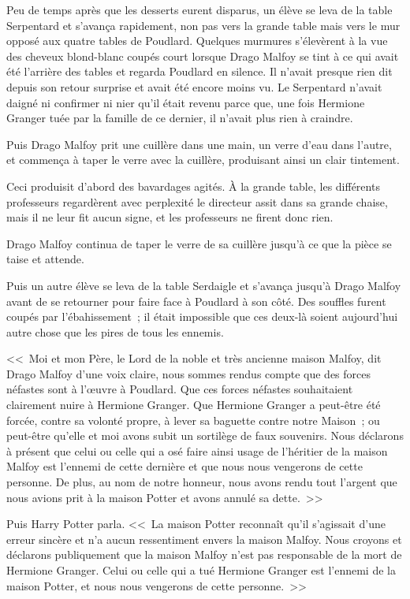 Peu de temps après que les desserts eurent disparus, un élève se leva de la table Serpentard et s'avança rapidement, non pas vers la grande table mais vers le mur opposé aux quatre tables de Poudlard. Quelques murmures s'élevèrent à la vue des cheveux blond-blanc coupés court lorsque Drago Malfoy se tint à ce qui avait été l'arrière des tables et regarda Poudlard en silence. Il n'avait presque rien dit depuis son retour surprise et avait été encore moins vu. Le Serpentard n'avait daigné ni confirmer ni nier qu'il était revenu parce que, une fois Hermione Granger tuée par la famille de ce dernier, il n'avait plus rien à craindre.

Puis Drago Malfoy prit une cuillère dans une main, un verre d'eau dans l'autre, et commença à taper le verre avec la cuillère, produisant ainsi un clair tintement.

Ceci produisit d'abord des bavardages agités. À la grande table, les différents professeurs regardèrent avec perplexité le directeur assit dans sa grande chaise, mais il ne leur fit aucun signe, et les professeurs ne firent donc rien.

Drago Malfoy continua de taper le verre de sa cuillère jusqu'à ce que la pièce se taise et attende.

Puis un autre élève se leva de la table Serdaigle et s'avança jusqu'à Drago Malfoy avant de se retourner pour faire face à Poudlard à son côté. Des souffles furent coupés par l'ébahissement~; il était impossible que ces deux-là soient aujourd'hui autre chose que les pires de tous les ennemis.

<<~Moi et mon Père, le Lord de la noble et très ancienne maison Malfoy, dit Drago Malfoy d'une voix claire, nous sommes rendus compte que des forces néfastes sont à l'œuvre à Poudlard. Que ces forces néfastes souhaitaient clairement nuire à Hermione Granger. Que Hermione Granger a peut-être été forcée, contre sa volonté propre, à lever sa baguette contre notre Maison~; ou peut-être qu'elle et moi avons subit un sortilège de faux souvenirs. Nous déclarons à présent que celui ou celle qui a osé faire ainsi usage de l'héritier de la maison Malfoy est l'ennemi de cette dernière et que nous nous vengerons de cette personne. De plus, au nom de notre honneur, nous avons rendu tout l'argent que nous avions prit à la maison Potter et avons annulé sa dette.~>>

Puis Harry Potter parla. <<~La maison Potter reconnaît qu'il s'agissait d'une erreur sincère et n'a aucun ressentiment envers la maison Malfoy. Nous croyons et déclarons publiquement que la maison Malfoy n'est pas responsable de la mort de Hermione Granger. Celui ou celle qui a tué Hermione Granger est l'ennemi de la maison Potter, et nous nous vengerons de cette personne.~>>

